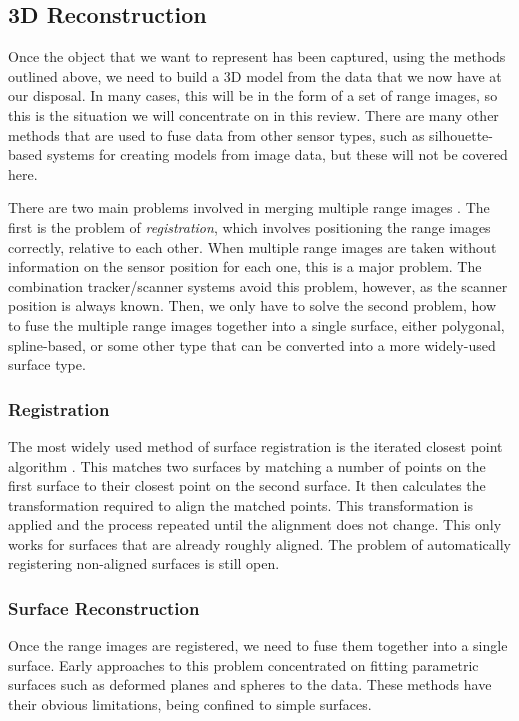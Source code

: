 \documentclass[10pt,oneside,fleqn,a4paper]{book}
\begin{document}
\subsection{\label{sec:reviewreconstruction}3D Reconstruction}
Once the object that we want to represent has been captured, using the methods outlined above, we need to build a 3D model from the data that we now have at our disposal. In many cases, this will be in the form of a set of range images, so this is the situation we will concentrate on in this review. There are many other methods that are used to fuse data from other sensor types, such as silhouette-based systems for creating models from image data, but these will not be covered here. 

There are two main problems involved in merging multiple range images \cite{Illingworth98}. The first is the problem of {\it registration}, which involves positioning the range images correctly, relative to each other. When multiple range images are taken without information on the sensor position for each one, this is a major problem. The combination tracker/scanner systems avoid this problem, however, as the scanner position is always known. Then, we only have to solve the second problem, how to fuse the multiple range images together into a single surface, either polygonal, spline-based, or some other type that can be converted into a more widely-used surface type.

\subsubsection{Registration}
The most widely used method of surface registration is the iterated closest point algorithm \cite{Besl92}. This matches two surfaces by matching a number of points on the first surface to their closest point on the second surface. It then calculates the transformation required to align the matched points. This transformation is applied and the process repeated until the alignment does not change. This only works for surfaces that are already roughly aligned. The problem of automatically registering non-aligned surfaces is still open.

\subsubsection{Surface Reconstruction}
Once the range images are registered, we need to fuse them together into a single surface. Early approaches to this problem concentrated on fitting parametric surfaces such as deformed planes and spheres to the data. These methods have their obvious limitations, being confined to simple surfaces.
\end{document}
